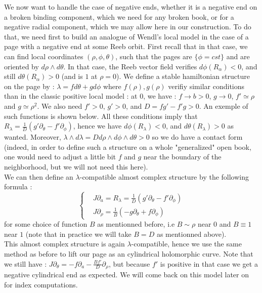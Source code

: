 \documentclass[../main.tex]{subfiles}
\begin{document}
We now want to handle the case of negative ends, whether it is a negative end on a broken binding component, which we need for any broken book, or for a negative radial component, which we may allow here in our construction. To do that, we need first to build an analogue of Wendl's local model in the case of a page with a negative end at some Reeb orbit. First recall that in that case, we can find local coordinates $(\rho,\phi,\theta)$, such that the pages are $\{\phi = cst \}$ and are oriented by $d\rho\wedge d\theta$. In that case, the Reeb vector field verifies $d\phi(R_\alpha) < 0$, and still $d\theta(R_\alpha) > 0$ (and is $1$ at $\rho = 0$). We define a stable hamiltonian structure on the page by : $\lambda = fd\theta + gd\phi$ where $f(\rho),g(\rho)$ verifiy similar conditions than in the classic positive local model : at $0$, we have : $f\rightarrow b>0$, $g\rightarrow 0$, $f'\simeq \rho$ and $g\simeq \rho^2$. We also need $f' > 0$, $g'>0$, and $D = fg' - f'g > 0$. An exemple of such functions is shown below. All these conditions imply that $R_\lambda = \frac{1}{D}(g'\partial_\theta - f'\partial_\phi)$, hence we have $d\phi(R_\lambda)< 0$, and $d\theta(R_\lambda)>0$ as wanted. Moreover, $\lambda \wedge d\lambda = Dd\rho\wedge d\phi\wedge d\theta > 0$ so we do have a contact form (indeed, in order to define such a structure on a whole "generalized" open book, one would need to adjust a little bit $f$ and $g$ near the boundary of the neighborhood, but we will not need this here). \\



We can then define an $\lambda$-compatible almost complex structure by the following formula :
$$\left\{
    \begin{array}{ll}
        & J\partial_a = R_\lambda = \frac{1}{D}(g'\partial_\theta - f'\partial_\phi) \\
        & J\partial_\rho = \frac{1}{B}(-g\partial_\theta + f\partial_\phi) 
    \end{array}
\right.$$
for some choice of function $B$ as mentionned before, i.e $B\sim \rho$ near $0$ and $B\equiv 1$ near $1$ (note that in practice we will take $B = D$ as mentionned above).\\

This almost complex structure is again $\lambda$-compatible, hence we use the same method as before to lift our page as an cylindrical holomorphic curve. Note that we still have : $J\partial_\theta = -f\partial_a - \frac{Bf'}{D}\partial_\rho$, but because $f'$ is positive in that case we get a negative cylindrical end as expected. We will come back on this model later on for index computations.\\
\end{document}
